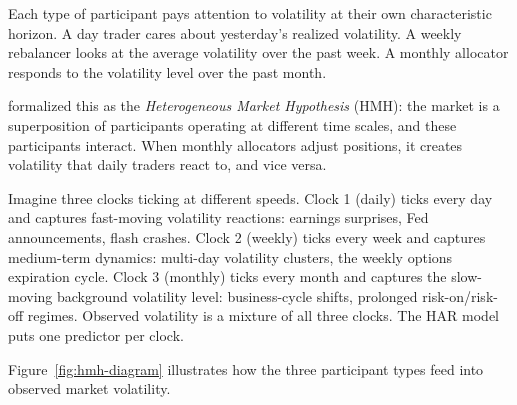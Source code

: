 Each type of participant pays attention to volatility at their own characteristic horizon.
A day trader cares about yesterday's realized volatility.
A weekly rebalancer looks at the average volatility over the past week.
A monthly allocator responds to the volatility level over the past month.

\citet{Muller1993} formalized this as the \emph{Heterogeneous Market Hypothesis} (HMH): the market is a superposition of participants operating at different time scales, and these participants interact.
When monthly allocators adjust positions, it creates volatility that daily traders react to, and vice versa.

\begin{intuition}
Imagine three clocks ticking at different speeds.
Clock 1 (daily) ticks every day and captures fast-moving volatility reactions: earnings surprises, Fed announcements, flash crashes.
Clock 2 (weekly) ticks every week and captures medium-term dynamics: multi-day volatility clusters, the weekly options expiration cycle.
Clock 3 (monthly) ticks every month and captures the slow-moving background volatility level: business-cycle shifts, prolonged risk-on/risk-off regimes.
Observed volatility is a mixture of all three clocks.
The HAR model puts one predictor per clock.
\end{intuition}

Figure~\ref{fig:hmh-diagram} illustrates how the three participant types feed into observed market volatility.

